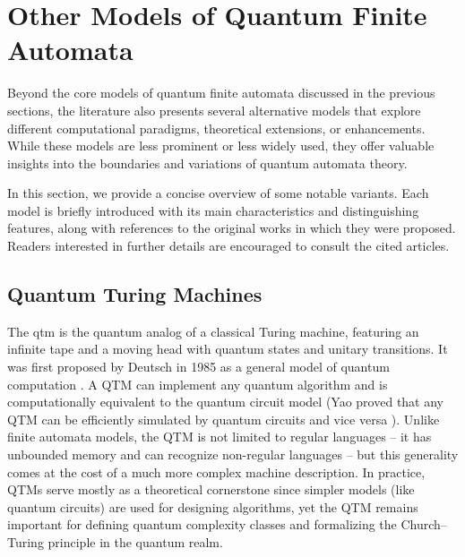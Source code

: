 \section{Other Models of Quantum Finite Automata}
\label{sec:other-models}

Beyond the core models of quantum finite automata discussed in the previous sections, the literature also presents several alternative models that explore different computational paradigms, theoretical extensions, or enhancements. While these models are less prominent or less widely used, they offer valuable insights into the boundaries and variations of quantum automata theory.

In this section, we provide a concise overview of some notable variants. Each model is briefly introduced with its main characteristics and distinguishing features, along with references to the original works in which they were proposed. Readers interested in further details are encouraged to consult the cited articles.

\subsection{Quantum Turing Machines} 
The \gls{qtm} is the quantum analog of a classical Turing machine, featuring an infinite tape and a moving head with quantum states and unitary transitions. It was first proposed by Deutsch in 1985 as a general model of quantum computation \cite{deutsch1985quantum}. A QTM can implement any quantum algorithm and is computationally equivalent to the quantum circuit model (Yao proved that any QTM can be efficiently simulated by quantum circuits and vice versa \cite{yao1993quantum}). Unlike finite automata models, the QTM is not limited to regular languages – it has unbounded memory and can recognize non-regular languages – but this generality comes at the cost of a much more complex machine description. In practice, QTMs serve mostly as a theoretical cornerstone since simpler models (like quantum circuits) are used for designing algorithms, yet the QTM remains important for defining quantum complexity classes and formalizing the Church–Turing principle in the quantum realm.

